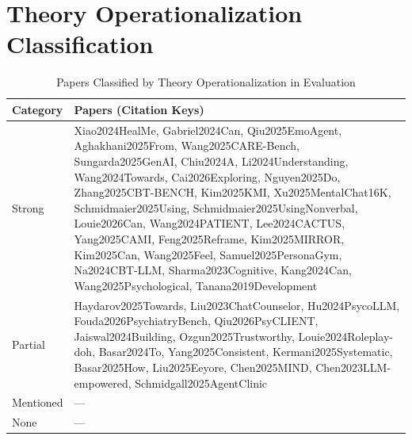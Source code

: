 \section{Theory Operationalization Classification}
\begin{table}[htbp]
\centering
\caption{Papers Classified by Theory Operationalization in Evaluation}
\label{tab:theory-operationalization}
\small
\begin{tabular}{p{2.5cm}p{12.4cm}}
\toprule
\textbf{Category} & \textbf{Papers (Citation Keys)} \\
\midrule
Strong & Xiao2024HealMe, Gabriel2024Can, Qiu2025EmoAgent, Aghakhani2025From, Wang2025CARE-Bench, Sungarda2025GenAI, Chiu2024A, Li2024Understanding, Wang2024Towards, Cai2026Exploring, Nguyen2025Do, Zhang2025CBT-BENCH, Kim2025KMI, Xu2025MentalChat16K, Schmidmaier2025Using, Schmidmaier2025UsingNonverbal, Louie2026Can, Wang2024PATIENT, Lee2024CACTUS, Yang2025CAMI, Feng2025Reframe, Kim2025MIRROR, Kim2025Can, Wang2025Feel, Samuel2025PersonaGym, Na2024CBT-LLM, Sharma2023Cognitive, Kang2024Can, Wang2025Psychological, Tanana2019Development \\
Partial & Haydarov2025Towards, Liu2023ChatCounselor, Hu2024PsycoLLM, Fouda2026PsychiatryBench, Qiu2026PsyCLIENT, Jaiswal2024Building, Ozgun2025Trustworthy, Louie2024Roleplay-doh, Basar2024To, Yang2025Consistent, Kermani2025Systematic, Basar2025How, Liu2025Eeyore, Chen2025MIND, Chen2023LLM-empowered, Schmidgall2025AgentClinic \\
Mentioned & --- \\
None & --- \\
\bottomrule
\end{tabular}
\end{table}


